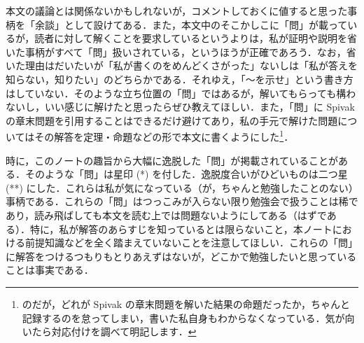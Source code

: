 本文の議論とは関係ないかもしれないが，コメントしておくに値すると思った事柄を「余談」として設けてある．また，本文中のそこかしこに「問」が載っているが，読者に対して解くことを要求しているというよりは，私が証明や説明を省いた事柄がすべて「問」扱いされている，というほうが正確であろう．なお，省いた理由はだいたいが「私が書くのをめんどくさがった」ないしは「私が答えを知らない，知りたい」のどちらかである．それゆえ，「〜を示せ」という書き方はしていない．そのような立ち位置の「問」ではあるが，解いてもらっても構わないし，いい感じに解けたと思ったらぜひ教えてほしい．また，「問」に Spivak の章末問題を引用することはできるだけ避けてあり，私の手元で解けた問題についてはその解答を定理・命題などの形で本文に書くようにした\footnote{のだが，どれが Spivak の章末問題を解いた結果の命題だったか，ちゃんと記録するのを怠ってしまい，書いた私自身もわからなくなっている．気が向いたら対応付けを調べて明記します．}．

時に，このノートの趣旨から大幅に逸脱した「問」が掲載されていることがある．そのような「問」は星印 (*) を付した．逸脱度合いがひどいものは二つ星 (**) にした．これらは私が気になっている（が，ちゃんと勉強したことのない）事柄である．これらの「問」はつっこみが入らない限り勉強会で扱うことは稀であり，読み飛ばしても本文を読む上では問題ないようにしてある（はずである）．特に，私が解答のあらすじを知っているとは限らないこと，本ノートにおける前提知識などを全く踏まえていないことを注意してほしい．これらの「問」に解答をつけるつもりもとりあえずはないが，どこかで勉強したいと思っていることは事実である．